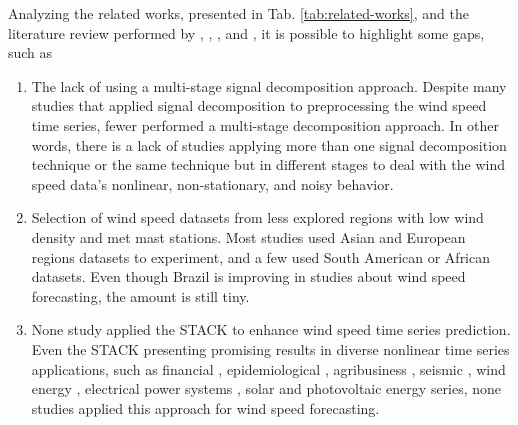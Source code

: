 Analyzing the related works, presented in Tab. \ref{tab:related-works}, and the literature review performed by , , , and , it is possible to highlight some gaps, such as
\begin{enumerate}[label=\roman*)]
    \item The lack of using a multi-stage signal decomposition approach. Despite many studies that applied signal decomposition to preprocessing the wind speed time series, fewer performed a multi-stage decomposition approach. In other words, there is a lack of studies applying more than one signal decomposition technique or the same technique but in different stages to deal with the wind speed data's nonlinear, non-stationary, and noisy behavior.
    
    \item Selection of wind speed datasets from less explored regions with low wind density and met mast stations. Most studies used Asian and European regions datasets to experiment, and a few used South American or African datasets. Even though Brazil is improving in studies about wind speed forecasting, the amount is still tiny. 
    
    \item None study applied the \ac{STACK} to enhance wind speed time series prediction. Even the \ac{STACK} presenting promising results in diverse nonlinear time series applications, such as financial \cite{dasilva2020Multistep}, epidemiological \cite{ribeiro2020Shortterm}, agribusiness \cite{ribeiro2020Ensemble}, seismic \cite{cui2021Stackingbased}, wind energy \cite{ribeiro2022Efficient}, electrical power systems \cite{stefenon2021Hybrid}, solar and photovoltaic energy \cite{fraccanabbia2020Solar} series, none studies applied this approach for wind speed forecasting.
\end{enumerate}